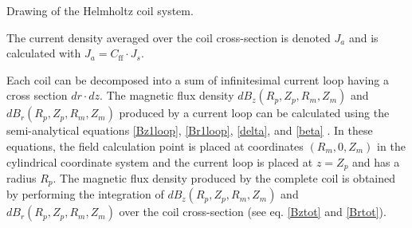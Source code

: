 \documentclass{ws-jmrr}
\begin{document}
\begin{multicols}{2}
\begin{figurehere}
\begin{center}
	\caption{Drawing of the Helmholtz coil system.}
	\label{coils}
	\end{center}
\end{figurehere}
The current density averaged over the coil cross-section is denoted $J_a$ and is calculated with $J_a=C_{\textrm{ff}} \cdot J_s$.\par 
Each coil can be decomposed into a sum of infinitesimal current loop having a cross section $dr\cdot dz$. The magnetic flux density $dB_z(R_p,Z_p,R_m,Z_m)$ and $dB_r(R_p,Z_p,R_m,Z_m)$ produced by a current loop can be calculated using the semi-analytical equations \ref{Bz1loop}, \ref{Br1loop}, \ref{delta}, and \ref{beta} \cite{simpson2001simple}. In these equations, the field calculation point is placed at coordinates $(R_m,0,Z_m)$ in the cylindrical coordinate system and the current loop is placed at $z=Z_p$ and has a radius $R_p$. The magnetic flux density produced by the complete coil is obtained by performing the integration of $dB_z(R_p,Z_p,R_m,Z_m)$ and $dB_r(R_p,Z_p,R_m,Z_m)$ over the coil cross-section (see eq. \ref{Bztot} and \ref{Brtot}).


\end{multicols}
\end{document}
